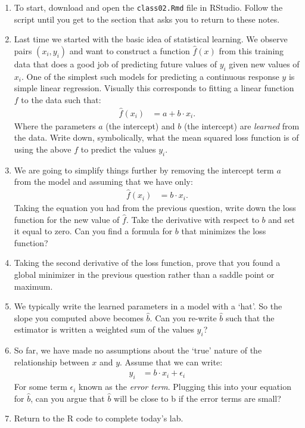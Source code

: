 \documentclass[12pt,hidelinks]{article}
\numberwithin{equation}{section}
\begin{document}
\begin{enumerate}
\item To start, download and open the \verb|class02.Rmd| file in RStudio.
Follow the script until you get to the section that asks you to return to
these notes.
\item Last time we started with the basic idea of statistical learning. We
observe pairs $(x_i, y_i)$ and want to construct a function $\widehat{f}(x)$ from this
training data that does a good job of predicting future values of $y_i$ given
new values of $x_i$. One of the simplest such models for predicting a
continuous response $y$ is simple linear regression. Visually this corresponds
to fitting a linear function $f$ to the data such that:
\begin{align}
\widehat{f}(x_i) &= a + b \cdot x_i.
\end{align}
Where the parameters $a$ (the intercept) and $b$ (the intercept) are
\textit{learned} from the data. Write down, symbolically, what the mean
squared loss function is of using the above $f$ to predict the values $y_i$.
\item We are going to simplify things further by removing the intercept term
$a$ from the model and assuming that we have only:
\begin{align}
\widehat{f}(x_i) &= b \cdot x_i.
\end{align}
Taking the equation you had from the previous question, write down the loss
function for the new value of $\widehat{f}$. Take the derivative with respect
to $b$ and set it equal to zero. Can you find a formula for $b$ that minimizes the
loss function?
\item Taking the second derivative of the loss function, prove that you found
a global minimizer in the previous question rather than a saddle point or
maximum.
\item We typically write the learned parameters in a model with a `hat'. So
the slope you computed above becomes $\widehat{b}$. Can you re-write $\widehat{b}$
such that the estimator is written a weighted sum of the values $y_i$?
\item So far, we have made no assumptions about the `true' nature of the
relationship between $x$ and $y$. Assume that we can write:
\begin{align}
y_i &= b \cdot x_i + \epsilon_i
\end{align}
For some term $\epsilon_i$ known as the \textit{error term}. Plugging this into
your equation for $\widehat{b}$, can you argue that $\widehat{b}$ will be close
to b if the error terms are small?
\item Return to the R code to complete today's lab.
\end{enumerate}
\end{document}
